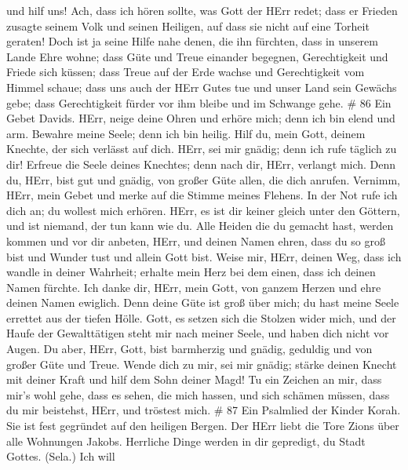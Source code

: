 und hilf uns!  Ach, dass ich hören sollte, was Gott der HErr
redet; dass er Frieden zusagte seinem Volk und seinen Heiligen, auf dass
sie nicht auf eine Torheit geraten!  Doch ist ja seine
Hilfe nahe denen, die ihn fürchten, dass in unserem Lande Ehre wohne;
 dass Güte und Treue einander begegnen, Gerechtigkeit und
Friede sich küssen;  dass Treue auf der Erde wachse und
Gerechtigkeit vom Himmel schaue;  dass uns auch der HErr
Gutes tue und unser Land sein Gewächs gebe;  dass
Gerechtigkeit fürder vor ihm bleibe und im Schwange gehe. \# 86
 Ein Gebet Davids. HErr, neige deine Ohren und erhöre mich;
denn ich bin elend und arm.  Bewahre meine Seele; denn ich
bin heilig. Hilf du, mein Gott, deinem Knechte, der sich verlässt auf
dich.  HErr, sei mir gnädig; denn ich rufe täglich zu dir!
 Erfreue die Seele deines Knechtes; denn nach dir, HErr,
verlangt mich.  Denn du, HErr, bist gut und gnädig, von
großer Güte allen, die dich anrufen.  Vernimm, HErr, mein
Gebet und merke auf die Stimme meines Flehens.  In der Not
rufe ich dich an; du wollest mich erhören.  HErr, es ist dir
keiner gleich unter den Göttern, und ist niemand, der tun kann wie du.
 Alle Heiden die du gemacht hast, werden kommen und vor dir
anbeten, HErr, und deinen Namen ehren,  dass du so groß
bist und Wunder tust und allein Gott bist.  Weise mir,
HErr, deinen Weg, dass ich wandle in deiner Wahrheit; erhalte mein Herz
bei dem einen, dass ich deinen Namen fürchte.  Ich danke
dir, HErr, mein Gott, von ganzem Herzen und ehre deinen Namen ewiglich.
 Denn deine Güte ist groß über mich; du hast meine Seele
errettet aus der tiefen Hölle.  Gott, es setzen sich die
Stolzen wider mich, und der Haufe der Gewalttätigen steht mir nach
meiner Seele, und haben dich nicht vor Augen.  Du aber,
HErr, Gott, bist barmherzig und gnädig, geduldig und von großer Güte und
Treue.  Wende dich zu mir, sei mir gnädig; stärke deinen
Knecht mit deiner Kraft und hilf dem Sohn deiner Magd!  Tu
ein Zeichen an mir, dass mir's wohl gehe, dass es sehen, die mich
hassen, und sich schämen müssen, dass du mir beistehst, HErr, und
tröstest mich. \# 87  Ein Psalmlied der Kinder Korah. Sie
ist fest gegründet auf den heiligen Bergen.  Der HErr liebt
die Tore Zions über alle Wohnungen Jakobs.  Herrliche Dinge
werden in dir gepredigt, du Stadt Gottes. (Sela.)  Ich will
